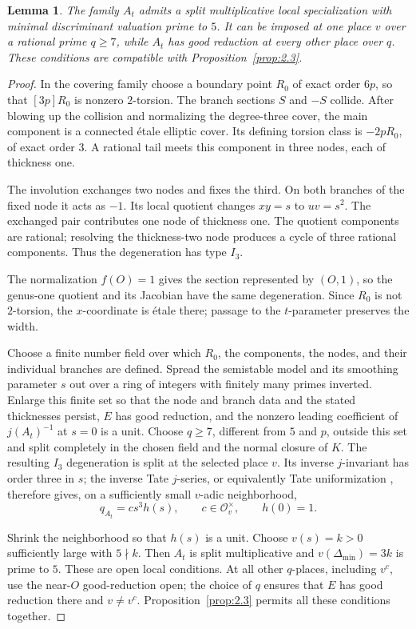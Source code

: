 \documentclass[11pt,a4paper]{article}
\newtheorem{lemma}[theorem]{Lemma}
\numberwithin{equation}{section}
\begin{document}
\begin{lemma}\label{lem:5.1}
The family \(A_t\) admits a split multiplicative local specialization with minimal discriminant valuation prime to \(5\). It can be imposed at one place \(v\) over a rational prime \(q\geq 7\), while \(A_t\) has good reduction at every other place over \(q\). These conditions are compatible with Proposition~\ref{prop:2.3}.
\end{lemma}

\begin{proof}
In the covering family choose a boundary point \(R_0\) of exact order \(6p\), so that \([3p]R_0\) is nonzero \(2\)-torsion. The branch sections \(S\) and \(-S\) collide. After blowing up the collision and normalizing the degree-three cover, the main component is a connected étale elliptic cover. Its defining torsion class is \(-2pR_0\), of exact order \(3\). A rational tail meets this component in three nodes, each of thickness one.

The involution exchanges two nodes and fixes the third. On both branches of the fixed node it acts as \(-1\). Its local quotient changes \(xy=s\) to \(uv=s^2\). The exchanged pair contributes one node of thickness one. The quotient components are rational; resolving the thickness-two node produces a cycle of three rational components. Thus the degeneration has type \(I_3\).

The normalization \(f(O)=1\) gives the section represented by \((O,1)\), so the genus-one quotient and its Jacobian have the same degeneration. Since \(R_0\) is not \(2\)-torsion, the \(x\)-coordinate is étale there; passage to the \(t\)-parameter preserves the width.

Choose a finite number field over which \(R_0\), the components, the nodes, and their individual branches are defined. Spread the semistable model and its smoothing parameter \(s\) out over a ring of integers with finitely many primes inverted. Enlarge this finite set so that the node and branch data and the stated thicknesses persist, \(E\) has good reduction, and the nonzero leading coefficient of \(j(A_t)^{-1}\) at \(s=0\) is a unit. Choose \(q\geq 7\), different from \(5\) and \(p\), outside this set and split completely in the chosen field and the normal closure of \(K\). The resulting \(I_3\) degeneration is split at the selected place \(v\). Its inverse \(j\)-invariant has order three in \(s\); the inverse Tate \(j\)-series, or equivalently Tate uniformization \cite[Chapter~V]{Si}, therefore gives, on a sufficiently small \(v\)-adic neighborhood,
\begin{equation*}
q_{A_t}=c s^3 h(s),\qquad
c\in\mathcal O_v^\times,\qquad h(0)=1.
\end{equation*}

Shrink the neighborhood so that \(h(s)\) is a unit. Choose \(v(s)=k>0\) sufficiently large with \(5\nmid k\). Then \(A_t\) is split multiplicative and \(v(\Delta_{\min})=3k\) is prime to \(5\). These are open local conditions. At all other \(q\)-places, including \(v^c\), use the near-\(O\) good-reduction open; the choice of \(q\) ensures that \(E\) has good reduction there and \(v\neq v^c\). Proposition~\ref{prop:2.3} permits all these conditions together.
\end{proof}
\end{document}
